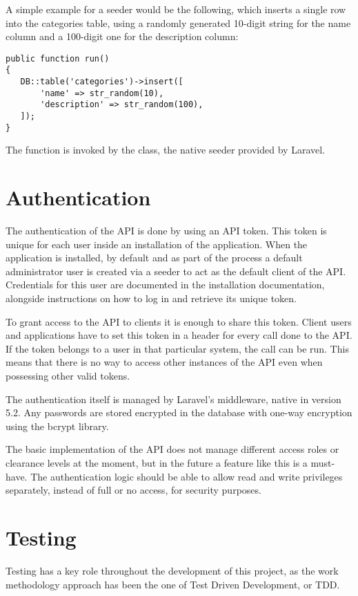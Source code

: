 A simple example for a seeder would be the following, which inserts a single row into the categories table, using a randomly generated 10-digit string for the name column and a 100-digit one for the description column:

\begin{verbatim}
public function run()
{
   DB::table('categories')->insert([
       'name' => str_random(10),
       'description' => str_random(100),
   ]);
}
\end{verbatim}

The  function is invoked by the  class, the native seeder provided by Laravel.

\section{Authentication}
The authentication of the API is done by using an API token.  This token is unique for each user inside an installation of the application. When the application is installed, by default and as part of the process a default administrator user is created via a seeder to act as the default client of the API. Credentials for this user are documented in the installation documentation, alongside instructions on how to log in and retrieve its unique token.

To grant access to the API to clients it is enough to share this token. Client users and applications have to set this token in a header for every call done to the API. If the token belongs to a user in that particular system, the call can be  run. This means that there is no way to access other instances of the API even when possessing other valid tokens.

The authentication itself is managed by Laravel’s  middleware, native in version 5.2. Any passwords are stored encrypted in the database with one-way encryption using the bcrypt library.

The basic implementation of the API does not manage different access roles or clearance levels at the moment, but in the future a feature like this is a must-have. The authentication logic should be able to allow read and write privileges separately, instead of full or no access, for security purposes.

\section{Testing}
Testing has a key role throughout the development of this project, as the work methodology approach has been the one of Test Driven Development, or TDD. 

